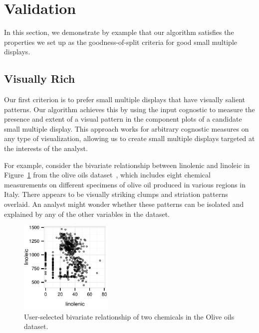 \section{Validation}
\label{sec:evaluation}
In this section, we demonstrate by example that our algorithm satisfies the properties we set up as the goodness-of-split criteria for good small multiple displays.


\subsection{Visually Rich}
Our first criterion is to prefer small multiple displays that have visually salient patterns. Our algorithm achieves this by using the input cognostic to measure the presence and extent of a visual pattern in the component plots of a candidate small multiple display. This approach works for arbitrary cognostic measures on any type of visualization, allowing us to create small multiple displays targeted at the interests of the analyst. 

For example, consider the bivariate relationship between linolenic and linoleic in Figure~\ref{fig:vrich_all} from the olive oils dataset~\cite{Forina1983}, which includes eight chemical measurements on different specimens of olive oil produced in various regions in Italy. There appears to be visually striking clumps and striation patterns overlaid. An analyst might wonder whether these patterns can be isolated and explained by any of the other variables in the dataset.

\begin{figure}[t]
 \centering 
	\includegraphics[width=1.75in]{images/linolenic-linoleic.pdf}
	  \caption{User-selected bivariate relationship of two chemicals in the Olive oils dataset. }
	 \label{fig:vrich_all}
\end{figure}

